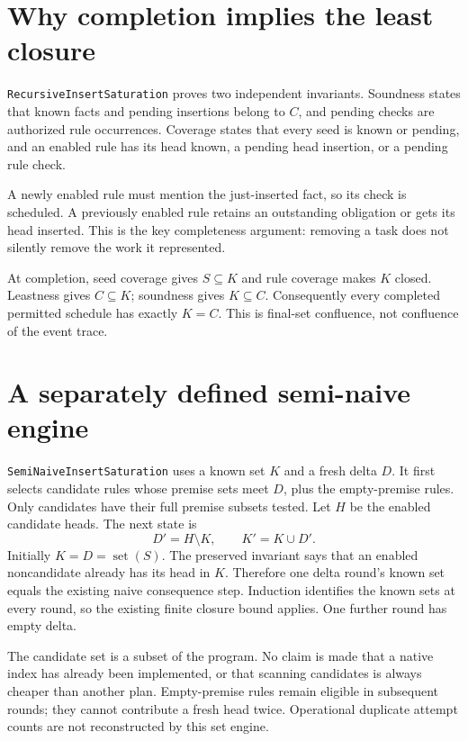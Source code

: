 \documentclass[11pt,a4paper]{article}
\newcommand{\code}[1]{\nolinkurl{#1}}
\begin{document}
\section{Why completion implies the least closure}

\code{RecursiveInsertSaturation} proves two independent invariants.
Soundness states that known facts and pending insertions belong to $C$,
and pending checks are authorized rule occurrences. Coverage states that
every seed is known or pending, and an enabled rule has its head known,
a pending head insertion, or a pending rule check.

A newly enabled rule must mention the just-inserted fact, so its check is
scheduled. A previously enabled rule retains an outstanding obligation or
gets its head inserted. This is the key completeness argument: removing a
task does not silently remove the work it represented.

At completion, seed coverage gives $S\subseteq K$ and rule coverage makes
$K$ closed. Leastness gives $C\subseteq K$; soundness gives $K\subseteq C$.
Consequently every completed permitted schedule has exactly $K=C$.
This is final-set confluence, not confluence of the event trace.

\section{A separately defined semi-naive engine}

\code{SemiNaiveInsertSaturation} uses a known set $K$ and a fresh delta $D$.
It first selects candidate rules whose premise sets meet $D$, plus the
empty-premise rules. Only candidates have their full premise subsets tested.
Let $H$ be the enabled candidate heads. The next state is
\[
  D'=H\setminus K,\qquad K'=K\cup D'.
\]
Initially $K=D=\operatorname{set}(S)$. The preserved invariant says that
an enabled noncandidate already has its head in $K$. Therefore one delta
round's known set equals the existing naive consequence step. Induction
identifies the known sets at every round, so the existing finite closure
bound applies. One further round has empty delta.

The candidate set is a subset of the program. No claim is made that a native
index has already been implemented, or that scanning candidates is always
cheaper than another plan. Empty-premise rules remain eligible in subsequent
rounds; they cannot contribute a fresh head twice. Operational duplicate
attempt counts are not reconstructed by this set engine.
\end{document}
